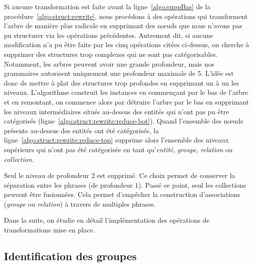 Si aucune transformation est faite avant la ligne~\ref{algo:suppBas} de la procédure~\ref{algo:struct:rewrite},
nous procédons à des opérations qui transforment l'arbre de manière plus radicale en supprimant des nœuds que nous n'avons pas pu structurer via les opérations précédentes.
Autrement dit, si aucune modification n'a pu être faite par les cinq opérations citées ci-dessus, on cherche à supprimer des structures trop complexes qui ne sont pas catégorisables.
Notamment, les arbres peuvent avoir une grande profondeur, mais nos grammaires autorisent uniquement une profondeur maximale de 5.
L'idée est donc de mettre à plat des structures trop profondes en supprimant un à un les niveaux.
L'algorithme construit les instances en commençant par le bas de l'arbre et en remontant, on commence alors par détruire l'arbre par le bas en supprimant les niveaux intermédiaires situés au-dessus des entités qui n'ont pas pu être catégorisés (ligne~\ref{algo:struct:rewrite:reduce-bot}).
Quand l'ensemble des nœuds présents au-dessus des entités ont été catégorisés, la ligne~\ref{algo:struct:rewrite:reduce-top} supprime alors l'ensemble des niveaux supérieurs qui n'ont pas été catégorisée en tant qu'\emph{entité}, \emph{groupe}, \emph{relation} ou \emph{collection}.

\begin{remark}
    Seul le niveau de profondeur $2$ est supprimé.
    Ce choix permet de conserver la séparation entre les phrases (de profondeur $1$).
    Passé ce point, seul les collections peuvent être fusionnées.
    Cela permet d'empêcher la construction d'associations (\emph{groupe} ou \emph{relation}) à travers de multiples phrases.
\end{remark}




Dans la suite, on étudie en détail l'implémentation des opérations de transformations mise en place.

\subsection{Identification des groupes}

